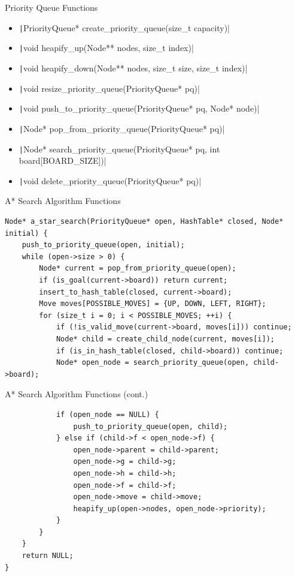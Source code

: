 \documentclass{oxblue-beamer}
\begin{document}
\begin{frame}{Priority Queue Functions}
\begin{itemize}
    \item \texttt|PriorityQueue* create_priority_queue(size_t capacity)|
    \item \texttt|void heapify_up(Node** nodes, size_t index)|
    \item \texttt|void heapify_down(Node** nodes, size_t size, size_t index)|
    \item \texttt|void resize_priority_queue(PriorityQueue* pq)|
    \item \texttt|void push_to_priority_queue(PriorityQueue* pq, Node* node)|
    \item \texttt|Node* pop_from_priority_queue(PriorityQueue* pq)|
    \item \texttt|Node* search_priority_queue(PriorityQueue* pq, int board[BOARD_SIZE])|
    \item \texttt|void delete_priority_queue(PriorityQueue* pq)|
\end{itemize}
\end{frame}

\begin{frame}[fragile]{A* Search Algorithm Functions}
\begin{verbatim}
Node* a_star_search(PriorityQueue* open, HashTable* closed, Node* initial) {
    push_to_priority_queue(open, initial);
    while (open->size > 0) {
        Node* current = pop_from_priority_queue(open);
        if (is_goal(current->board)) return current;
        insert_to_hash_table(closed, current->board);
        Move moves[POSSIBLE_MOVES] = {UP, DOWN, LEFT, RIGHT};
        for (size_t i = 0; i < POSSIBLE_MOVES; ++i) {
            if (!is_valid_move(current->board, moves[i])) continue;
            Node* child = create_child_node(current, moves[i]);
            if (is_in_hash_table(closed, child->board)) continue;
            Node* open_node = search_priority_queue(open, child->board);
\end{verbatim}
\end{frame}

\begin{frame}[fragile]{A* Search Algorithm Functions (cont.)}
\begin{verbatim}
            if (open_node == NULL) {
                push_to_priority_queue(open, child);
            } else if (child->f < open_node->f) {
                open_node->parent = child->parent;
                open_node->g = child->g;
                open_node->h = child->h;
                open_node->f = child->f;
                open_node->move = child->move;
                heapify_up(open->nodes, open_node->priority);
            }
        }
    }
    return NULL;
}
\end{verbatim}
\end{frame}
\end{document}
